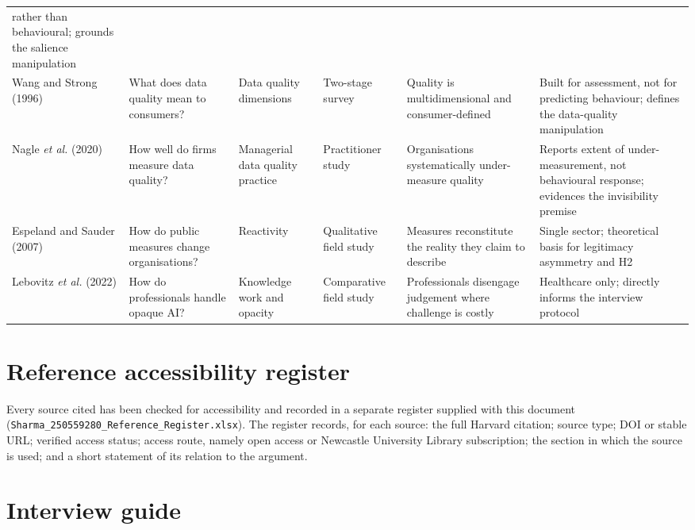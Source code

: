 \documentclass[11pt,a4paper]{article}
\numberwithin{figure}{section}
\numberwithin{table}{section}
\begin{document}
\begin{longtable}{@{}p{2.1cm} p{2.4cm} p{2.3cm} p{2.4cm} p{2.5cm} p{2.6cm}@{}}
rather than behavioural; grounds the salience manipulation \\
\addlinespace
\footnotesize Wang and Strong (1996) & What does data quality mean to consumers? & Data quality dimensions &
Two-stage survey & Quality is multidimensional and consumer-defined & Built for assessment, not for
predicting behaviour; defines the data-quality manipulation \\
\addlinespace
\footnotesize Nagle \emph{et al.} (2020) & How well do firms measure data quality? & Managerial data quality
practice & Practitioner study & Organisations systematically under-measure quality & Reports extent of
under-measurement, not behavioural response; evidences the invisibility premise \\
\addlinespace
\footnotesize Espeland and Sauder (2007) & How do public measures change organisations? & Reactivity &
Qualitative field study & Measures reconstitute the reality they claim to describe & Single sector;
theoretical basis for legitimacy asymmetry and H2 \\
\addlinespace
\footnotesize Lebovitz \emph{et al.} (2022) & How do professionals handle opaque AI? & Knowledge work and
opacity & Comparative field study & Professionals disengage judgement where challenge is costly &
Healthcare only; directly informs the interview protocol \\
\end{longtable}

\section{Reference accessibility register}

Every source cited has been checked for accessibility and recorded in a separate register supplied with
this document (\texttt{Sharma\_250559280\_Reference\_Register.xlsx}). The register records, for each source:
the full Harvard citation; source type; DOI or stable URL; verified access status; access route, namely open
access or Newcastle University Library subscription; the section in which the source is used; and a short
statement of its relation to the argument.

\section{Interview guide}
\end{document}
